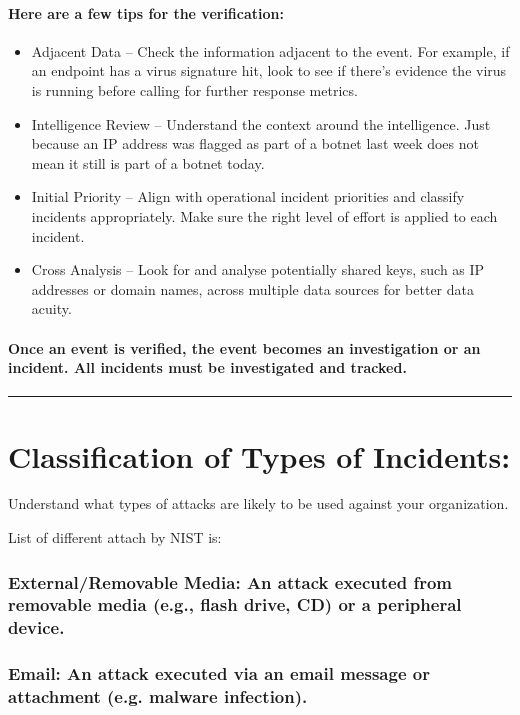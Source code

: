 \documentclass[british]{article}
\begin{document}
\paragraph*{Here are a few tips for the verification:}
\begin{itemize}
	\item Adjacent Data -- Check the information adjacent to the event. For
	      example, if an endpoint has a virus signature hit, look to see if
	      there's evidence the virus is running before calling for further
	      response metrics.
	\item Intelligence Review -- Understand the context around the intelligence.
	      Just because an IP address was flagged as part of a botnet last week
	      does not mean it still is part of a botnet today.
	\item Initial Priority -- Align with operational incident priorities and
	      classify incidents appropriately. Make sure the right level of effort
	      is applied to each incident.
	\item Cross Analysis -- Look for and analyse potentially shared keys, such
	      as IP addresses or domain names, across multiple data sources for
	      better data acuity.
\end{itemize}

\paragraph{Once an event is verified, the event becomes an investigation or
	an incident. All incidents must be investigated and tracked.}

\rule[0.5ex]{0.75\columnwidth}{1pt}

\section{Classification of Types of Incidents:}

Understand what types of attacks are likely to be used against your
organization.

List of different attach by NIST is:

\subsubsection{External/Removable Media: An attack executed from removable media
	(e.g., flash drive, CD) or a peripheral device.}

\subsubsection{Email: An attack executed via an email message or attachment (e.g.
	malware infection).}
\end{document}
